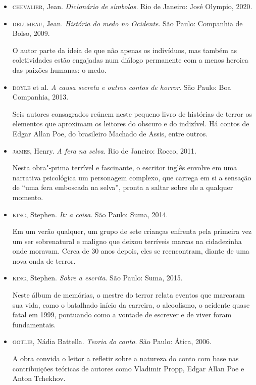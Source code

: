 \documentclass[12pt]{extarticle}
\begin{document}
\begin{itemize}
\item \textsc{chevalier}, Jean. \textit{Dicionário de símbolos.} Rio de Janeiro: José Olympio, 2020.

\item \textsc{delumeau}, Jean. \textit{História do medo no Ocidente}. São Paulo:
Companhia de Bolso, 2009.

O autor parte da ideia de que não apenas os indivíduos, mas também as
coletividades estão engajadas num diálogo permanente com a menos heroica
das paixões humanas: o medo.

\item \textsc{doyle} et al. \textit{A causa secreta e outros contos de horror}. São
Paulo: Boa Companhia, 2013.

Seis autores consagrados reúnem neste pequeno livro de histórias de
terror os elementos que aproximam os leitores do obscuro e do indizível.
Há contos de Edgar Allan Poe, do brasileiro Machado de Assis, entre
outros.

\item \textsc{james}, Henry. \textit{A fera na selva}. Rio de Janeiro: Rocco, 2011.

Nesta obra"-prima terrível e fascinante, o escritor inglês envolve em uma
narrativa psicológica um personagem complexo, que carrega em si a
sensação de ``uma fera emboscada na selva'', pronta a saltar sobre ele a
qualquer momento.

\item \textsc{king}, Stephen. \textit{It: a coisa}. São Paulo: Suma, 2014.

Em um verão qualquer, um grupo de sete crianças enfrenta pela primeira
vez um ser sobrenatural e maligno que deixou terríveis marcas na
cidadezinha onde moravam. Cerca de 30 anos depois, eles se reencontram,
diante de uma nova onda de terror.

\item \textsc{king}, Stephen. \textit{Sobre a escrita}. São Paulo: Suma, 2015.

Neste álbum de memórias, o mestre do terror relata eventos que marcaram
sua vida, como o batalhado início da carreira, o alcoolismo, o acidente
quase fatal em 1999, pontuando como a vontade de escrever e de viver
foram fundamentais.

\item \textsc{gotlib}, Nádia Battella. \textit{Teoria do conto}. São Paulo: Ática, 2006.

A obra convida o leitor a refletir sobre a natureza do conto com base
nas contribuições teóricas de autores como Vladimir Propp, Edgar Allan
Poe e Anton Tchekhov.


\end{itemize}
\end{document}
